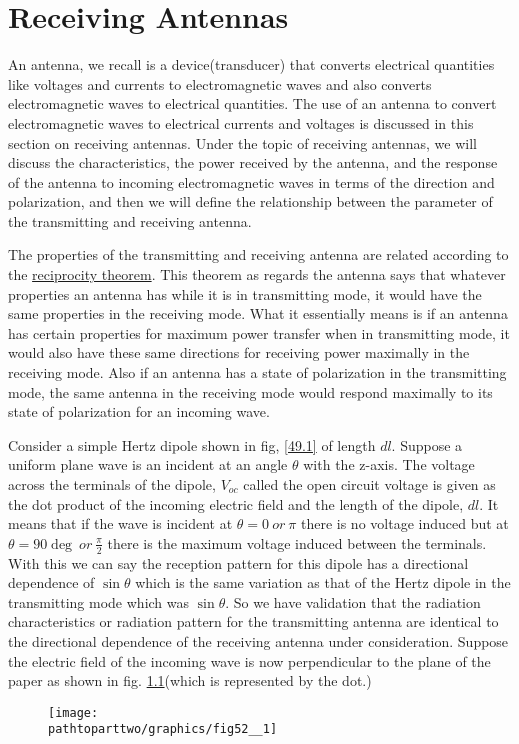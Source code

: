 \chapter{Receiving Antennas}
An antenna, we recall is a device(transducer) that converts electrical quantities like voltages and currents to electromagnetic waves and also converts electromagnetic waves to electrical quantities. The use of an antenna to convert electromagnetic waves to electrical currents and voltages is discussed in this section on receiving antennas. Under the topic of receiving antennas, we will discuss the characteristics, the power received by the antenna, and the response of the antenna to incoming electromagnetic waves in terms of the direction and polarization, and then we will define the relationship between the parameter of the transmitting and receiving antenna.

The properties of the transmitting and receiving antenna are related according to the \underline{reciprocity theorem}. This theorem as regards the antenna says that whatever properties an antenna has while it is in transmitting mode, it would have the same properties in the receiving mode. What it essentially means is if an antenna has certain properties for maximum power transfer when in transmitting mode, it would also have these same directions for receiving power maximally in the receiving mode. Also if an antenna has a state of polarization in the transmitting mode, the same antenna in the receiving mode would respond maximally to its state of polarization for an incoming wave.

Consider a simple Hertz dipole shown in fig, \ref{49.1} of length $dl$. Suppose a uniform plane wave is an incident at an angle $\theta$ with the z-axis. The voltage across the terminals of the dipole, $V_{oc}$ called the open circuit voltage is given as the dot product of the incoming electric field and the length of the dipole, $dl$. It means that if the wave is incident at $\theta = 0\ or\ \pi$ there is no voltage induced but at $\theta = 90\deg\ or\ \frac{\pi}{2}$ there is the maximum voltage induced between the terminals. With this we can say the reception pattern for this dipole has a directional dependence of $\sin\theta$ which is the same variation as that of the Hertz dipole in the transmitting mode which was $\sin\theta$. So we have validation that the radiation characteristics or radiation pattern for the transmitting antenna are identical to the directional dependence of the receiving antenna under consideration. Suppose the electric field of the incoming wave is now perpendicular to the plane of the paper as shown in fig. \ref{49.2}(which is represented by the dot.)
\begin{figure}[h]
\centering
\texttt{[image: \\pathtoparttwo/graphics/fig52\_\_1]}
\caption{}
\label{49.2}
\end{figure}

